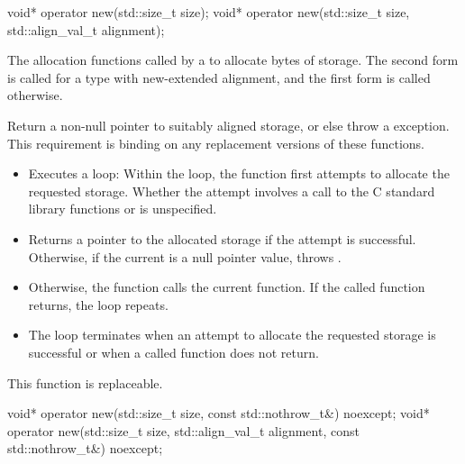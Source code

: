 %
\begin{itemdecl}
void* operator new(std::size_t size);
void* operator new(std::size_t size, std::align_val_t alignment);
\end{itemdecl}

\begin{itemdescr}
\pnum
\effects
The
allocation functions
called by a
to allocate
 bytes of storage.
The second form is called for a type with new-extended alignment, and
the first form is called otherwise.

\pnum
\required
Return a non-null pointer to suitably aligned storage,
or else throw a
%
exception.
This requirement is binding on any replacement versions of these functions.

\pnum
{}

\begin{itemize}
\item
Executes a loop:
Within the loop, the function first attempts to allocate the requested storage.
Whether the attempt involves a call to the C standard library functions
 or 
is unspecified.
%
\item
Returns a pointer to the allocated storage if the attempt is successful.
Otherwise, if the
current  is
a null pointer value, throws
.
\item
Otherwise, the function calls the current
 function.
If the called function returns, the loop repeats.
\item
The loop terminates when an attempt to allocate the requested storage is
successful or when a called
function does not return.
\end{itemize}

\pnum
\remarks
This function is replaceable.
\end{itemdescr}

%
\begin{itemdecl}
void* operator new(std::size_t size, const std::nothrow_t&) noexcept;
void* operator new(std::size_t size, std::align_val_t alignment, const std::nothrow_t&) noexcept;
\end{itemdecl}

